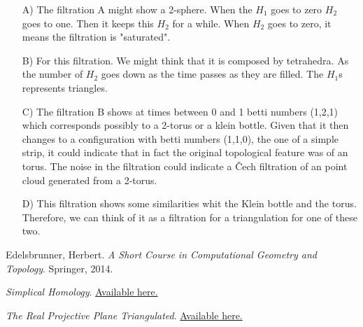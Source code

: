 \documentclass[10pt]{article} %
\theoremstyle{problemstyle}
\begin{document}
    \begin{enumerate}
        \item[A)] The filtration A might show a 2-sphere. When the $H_1$ goes to zero $H_2$ goes to one. Then it keeps this $H_2$ for a while. When $H_2$ goes to zero, it means the filtration is "saturated".  
        \item[B)] For this filtration. We might think that it is composed by  tetrahedra. As the number of $H_2$ goes down as the time passes as they are filled. The $H_1$s represents triangles.
        \item[C)]The filtration B shows at times between 0 and 1 betti numbers (1,2,1) which corresponds possibly to a 2-torus or a klein bottle. Given that it then changes to a configuration with betti numbers (1,1,0), the one of a simple strip, it could indicate that in fact the original topological feature was of an torus. The noise in the filtration could indicate a Čech filtration of an point cloud generated from a 2-torus.
        \item[D)] This filtration shows some similarities whit the Klein bottle and the torus. Therefore, we can think of it as a filtration for a triangulation for one of these two.
    \end{enumerate}


\begin{thebibliography}{1}
	Edelsbrunner, Herbert.
	\textit{A Short Course in Computational Geometry and Topology}. 
	Springer, 2014.
    
    \textit{Simplical Homology}. 
    \href{https://www.fields.utoronto.ca/programs/scientific/04-05/data_sets/parent.pdf}{Available here.}
    
    \textit{The Real Projective Plane Triangulated}.
    \href{http://www.math.jhu.edu/~jmb/note/rp2tri.pdf}{Available here.}
\end{thebibliography}
\end{document}

